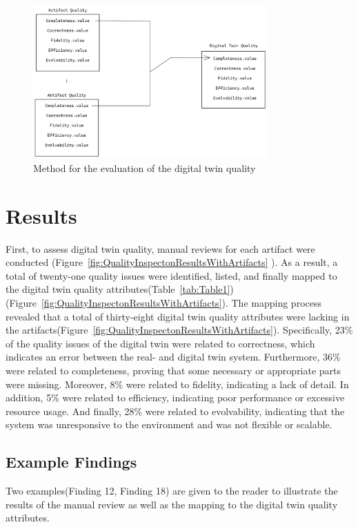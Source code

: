 \documentclass{llncs}
\begin{document}
    \begin{figure}[htbp]
        \centering
        \includegraphics[width = 0.8\textwidth]{DigitalTwinQuality.png}
            \caption{Method for the evaluation of the digital twin quality}\label{fig:MethodforDigitalTwinQuality}
    \end{figure}
   
    
    \section{Results}

    First, to assess digital twin quality,
    manual reviews for each artifact were conducted (Figure~\ref{fig:QualityInspectonResultsWithArtifacts} ). 
    As a result, a total of twenty-one quality issues were identified,
    listed, and finally mapped to the digital twin quality attributes(Table~\ref{tab:Table1})(Figure~\ref{fig:QualityInspectonResultsWithArtifacts}).
    The mapping process 
    revealed that a total of thirty-eight digital twin quality attributes were 
    lacking in the artifacts(Figure~\ref{fig:QualityInspectonResultsWithArtifacts}).  
    Specifically, 23\% of the quality issues of the digital twin were related to correctness, 
    which indicates an error between the real- and digital twin system. Furthermore, 36\%  were related 
    to completeness, proving that some necessary or appropriate parts were missing.
    Moreover, 8\%  were related to fidelity, indicating a lack of detail. 
    In addition, 5\%  were related to efficiency, indicating poor performance or excessive resource usage.
    And finally, 28\% were related to evolvability, indicating that the system was unresponsive 
    to the environment and was not flexible or scalable.  

    \subsection{Example Findings}  
    Two examples(Finding 12, Finding 18) are given to the reader to illustrate 
    the results of the manual review as well as the mapping to the digital twin quality attributes. 
\end{document}
